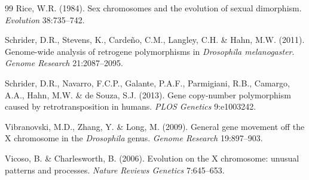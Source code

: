 \documentclass[11pt,a4paper]{article}
\begin{document}
\begin{thebibliography}{99}
 Rice, W.R. (1984). Sex chromosomes and the evolution of sexual dimorphism. \emph{Evolution} 38:735--742.

 Schrider, D.R., Stevens, K., Carde\~no, C.M., Langley, C.H. \& Hahn, M.W. (2011). Genome-wide analysis of retrogene polymorphisms in \emph{Drosophila melanogaster}. \emph{Genome Research} 21:2087--2095.

 Schrider, D.R., Navarro, F.C.P., Galante, P.A.F., Parmigiani, R.B., Camargo, A.A., Hahn, M.W. \& de Souza, S.J. (2013). Gene copy-number polymorphism caused by retrotransposition in humans. \emph{PLOS Genetics} 9:e1003242.

 Vibranovski, M.D., Zhang, Y. \& Long, M. (2009). General gene movement off the X chromosome in the \emph{Drosophila} genus. \emph{Genome Research} 19:897--903.

 Vicoso, B. \& Charlesworth, B. (2006). Evolution on the X chromosome: unusual patterns and processes. \emph{Nature Reviews Genetics} 7:645--653.

\end{thebibliography}
\end{document}
